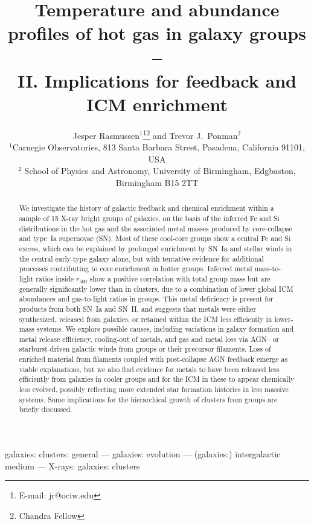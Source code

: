 \documentclass[useAMS,usenatbib]{mn2e}
\title[Feedback and ICM enrichment in galaxy groups]{Temperature and
  abundance profiles of hot gas in galaxy groups --\\ II. Implications
  for feedback and ICM enrichment}
\author[J. Rasmussen and T. J. Ponman]{Jesper
    Rasmussen$^{1}$\thanks{E-mail: jr@ociw.edu}\thanks{Chandra Fellow}
    and Trevor J.~Ponman$^{2}$ \\ $^{1}$Carnegie Observatories, 813
    Santa Barbara Street, Pasadena, California 91101, USA\\ $^{2}$
    School of Physics and Astronomy, University of Birmingham,
    Edgbaston, Birmingham B15 2TT}
\begin{document}
 
 
\date{} 
 
\pagerange{\pageref{firstpage}--\pageref{lastpage}}  
 
\maketitle 
 
\label{firstpage} 
 
\begin{abstract}
  We investigate the history of galactic feedback and chemical
  enrichment within a sample of 15 X-ray bright groups of galaxies, on
  the basis of the inferred Fe and Si distributions in the hot gas and
  the associated metal masses produced by core-collapse and type~Ia
  supernovae (SN). Most of these cool-core groups show a central Fe
  and Si excess, which can be explained by prolonged enrichment by
  SN~Ia and stellar winds in the central early-type galaxy alone, but
  with tentative evidence for additional processes contributing to
  core enrichment in hotter groups. Inferred metal mass-to-light
  ratios inside $r_{500}$ show a positive correlation with total group
  mass but are generally significantly lower than in clusters, due to
  a combination of lower global ICM abundances and gas-to-light ratios
  in groups. This metal deficiency is present for products from both
  SN~Ia and SN~II, and suggests that metals were either synthesized,
  released from galaxies, or retained within the ICM less efficiently
  in lower-mass systems. We explore possible causes, including
  variations in galaxy formation and metal release efficiency,
  cooling-out of metals, and gas and metal loss via AGN-- or
  starburst-driven galactic winds from groups or their precursor
  filaments. Loss of enriched material from filaments coupled with
  post-collapse AGN feedback emerge as viable explanations, but we
  also find evidence for metals to have been released less efficiently
  from galaxies in cooler groups and for the ICM in these to appear
  chemically less evolved, possibly reflecting more extended star
  formation histories in less massive systems.  Some implications for
  the hierarchical growth of clusters from groups are briefly
  discussed.

\end{abstract} 
 
\begin{keywords} 
  galaxies: clusters: general --- galaxies: evolution --- 
  (galaxies:) intergalactic medium --- X-rays: galaxies: clusters
\end{keywords} 
 
\end{document}
